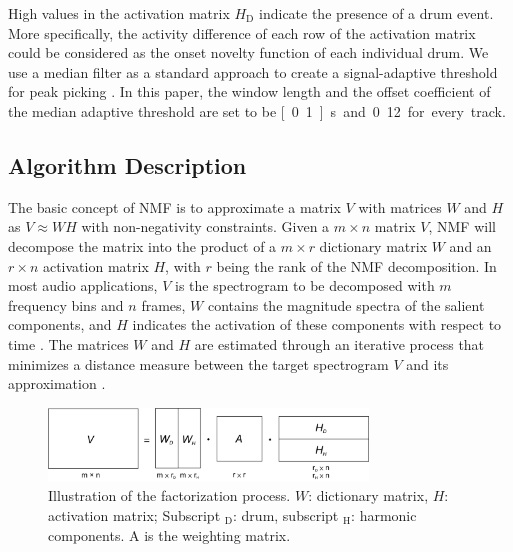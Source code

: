 \documentclass{article}
\begin{document}
High values in the activation matrix $H_\mathrm{D}$ indicate the presence of a drum event. More specifically, the activity difference of each row of the activation matrix could be considered as the onset novelty function of each individual drum. We use a median filter as a standard approach to create a signal-adaptive threshold for peak picking \cite{Lerch2012}. In this paper, the window length and the offset coefficient of the median adaptive threshold are set to be \unit[0.1]{s} and 0.12 for every track.

\subsection{Algorithm Description}\label{subsec:algorithm}
The basic concept of NMF is to approximate a matrix $V$ with matrices $W$ and $H$ as $V \approx WH$ with non-negativity constraints. Given a $m \times n$ matrix $V$, NMF will decompose the matrix into the product of a $m \times r$ dictionary matrix $W$ and an $r \times n$ activation matrix $H$, with $r$ being the rank of the NMF decomposition. In most audio applications, $V$ is the spectrogram to be decomposed with $m$ frequency bins and $n$ frames, $W$ contains the magnitude spectra of the salient components, and $H$ indicates the activation of these components with respect to time \cite{smaragdis_non-negative_2003}. The matrices $W$ and $H$ are estimated through an iterative process that minimizes a distance measure between the target spectrogram $V$ and its approximation \cite{lee_algorithms_2000}. 

\begin{figure}
 \centering 
  \centerline{
 \includegraphics[width=8.5cm]{factorization2.png}}
 \caption{Illustration of the factorization process. $W$: dictionary matrix, $H$: activation matrix; Subscript $_\mathrm{D}$: drum, subscript $_\mathrm{H}$: harmonic components. $\mathrm{A}$ is the weighting matrix. }
 \label{fig:factorization}
\end{figure}
\end{document}
